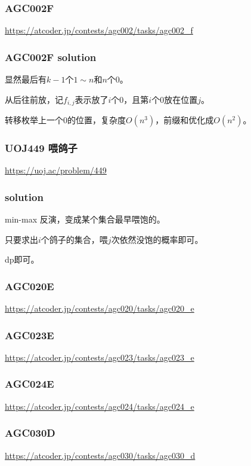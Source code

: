 \documentclass[10pt]{beamer}
\begin{document}
\begin{frame}
	\frametitle{AGC002F}

	\url{https://atcoder.jp/contests/agc002/tasks/agc002_f}
\end{frame}
\clearpage

\begin{frame}
	\frametitle{AGC002F solution}

	显然最后有$k-1$个$1\sim n$和$n$个$0$。
	
	从后往前放，记$f_{i,j}$表示放了$i$个$0$，且第$i$个$0$放在位置$j$。

	转移枚举上一个$0$的位置，复杂度$O(n^3)$，前缀和优化成$O(n^2)$。

\end{frame}
\clearpage
\begin{frame}
	\frametitle{UOJ449 喂鸽子}

	\url{https://uoj.ac/problem/449}

\end{frame}
\clearpage
\begin{frame}
	\frametitle{solution}

	min-max 反演，变成某个集合最早喂饱的。

	只要求出$i$个鸽子的集合，喂$j$次依然没饱的概率即可。
	
	dp即可。
\end{frame}
\clearpage
\begin{frame}
	\frametitle{AGC020E}

	\url{https://atcoder.jp/contests/agc020/tasks/agc020_e}

\end{frame}
\clearpage
\begin{frame}
	\frametitle{AGC023E}

	\url{https://atcoder.jp/contests/agc023/tasks/agc023_e}

\end{frame}
\clearpage
\begin{frame}
	\frametitle{AGC024E}

	\url{https://atcoder.jp/contests/agc024/tasks/agc024_e}

\end{frame}
\clearpage
\begin{frame}
	\frametitle{AGC030D}

	\url{https://atcoder.jp/contests/agc030/tasks/agc030_d}

\end{frame}
\end{document}
